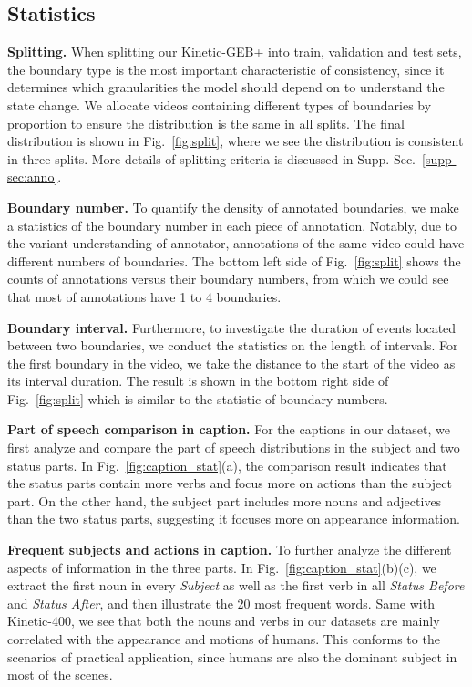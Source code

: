 \documentclass[runningheads]{llncs}
\begin{document}
\subsection{Statistics}


\textbf{Splitting.}
When splitting our Kinetic-GEB+ into train, validation and test sets, the boundary type is the most important characteristic of consistency, since it determines which granularities the model should depend on to understand the state change. We allocate videos containing different types of boundaries by proportion to ensure the distribution is the same in all splits. The final distribution is shown in Fig.~\ref{fig:split}, where we see the distribution is consistent in three splits. More details of splitting criteria is discussed in Supp. Sec.~\ref{supp-sec:anno}.


\textbf{Boundary number.}
To quantify the density of annotated boundaries, we make a statistics of the boundary number in each piece of annotation. Notably, due to the variant understanding of annotator, annotations of the same video could have different numbers of boundaries. The bottom left side of Fig.~\ref{fig:split} shows the counts of annotations versus their boundary numbers, from which we could see that most of annotations have 1 to 4 boundaries. 




\textbf{Boundary interval.}
Furthermore, to investigate the duration of events located between two boundaries, we conduct the statistics on the length of intervals. For the first boundary in the video, we take the distance to the start of the video as its interval duration. The result is shown in the bottom right side of Fig.~\ref{fig:split} which is similar to the statistic of boundary numbers.


\textbf{Part of speech comparison in caption.}
For the captions in our dataset, we first analyze and compare the part of speech distributions in the subject and two status parts. In Fig.~\ref{fig:caption_stat}(a), the comparison result indicates that the status parts contain more verbs and focus more on actions than the subject part. On the other hand, the subject part includes more nouns and adjectives than the two status parts, suggesting it focuses more on appearance information. 


\textbf{Frequent subjects and actions in caption.}
To further analyze the different aspects of information in the three parts. In Fig.~\ref{fig:caption_stat}(b)(c), we extract the first noun in every \textit{Subject} as well as the first verb in all \textit{Status Before} and \textit{Status After}, and then illustrate the 20 most frequent words. Same with Kinetic-400, we see that both the nouns and verbs in our datasets are mainly correlated with the appearance and motions of humans. This conforms to the scenarios of practical application, since humans are also the dominant subject in most of the scenes. 
\end{document}

